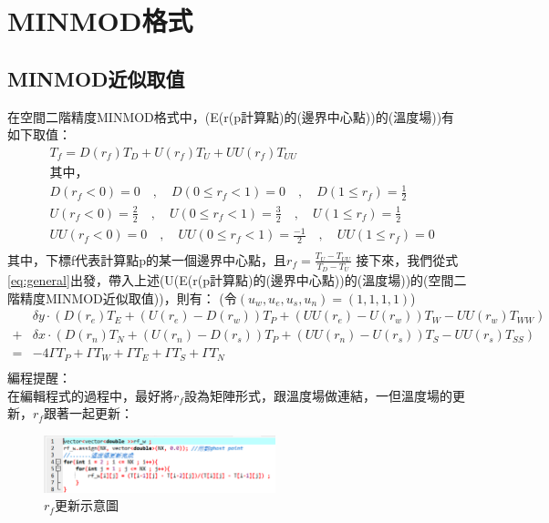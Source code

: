 \documentclass[12pt]{article}
\begin{document}
\section{MINMOD格式}
\subsection{MINMOD近似取值}
\noindent 在空間二階精度MINMOD格式中，(E(r(p計算點)的(邊界中心點))的(溫度場))有如下取值：
\begin{equation*}\begin{split}
    &T_{f} = D(r_{f})T_{D}+U(r_{f})T_{U}+UU(r_{f})T_{UU}\\[1.5ex]
    &\text{其中，}\\
    &D(r_{f}<0) = 0\quad,\quad D(0 \leq r_{f}<1) = 0 \quad,\quad D(1 \leq r_{f}) = \frac{1}{2}  \\[1.5ex]
    &U(r_{f}<0) = \frac{2}{2}\quad,\quad U(0 \leq r_{f}<1) = \frac{3}{2}\quad,\quad U(1 \leq r_{f}) = \frac{1}{2} \\[1.5ex]
    &UU(r_{f}<0) = 0\quad,\quad UU(0 \leq r_{f}<1) = \frac{-1}{2}\quad,\quad UU(1 \leq r_{f}) = 0 \\[1.5ex] 
\end{split}\end{equation*}
\noindent 其中，下標f代表計算點p的某一個邊界中心點，且$r_{f} = \frac{T_{U} - T_{UU}}{T_{D} - T_{U}}$
接下來，我們從式\ref{eq:general}出發，帶入上述(U(E(r(p計算點)的(邊界中心點))的(溫度場))的(空間二階精度MINMOD近似取值))，則有：
(令$(u_{w},u_{e},u_{s},u_{n}) = (1,1,1,1)$)
\begin{equation}\begin{split}
     &\delta y \cdot (D(r_{e})T_{E}+(U(r_{e})-D(r_{w}))T_{P}+(UU(r_{e})-U(r_{w}))T_{W} -UU(r_{w})T_{WW})\\[1.5ex]
    +&\delta x \cdot (D(r_{n})T_{N}+(U(r_{n})-D(r_{s}))T_{P}+(UU(r_{n})-U(r_{s}))T_{S} -UU(r_{s})T_{SS})\\[1.5ex]
    =& -4\Gamma T_{P} + \Gamma T_{W} + \Gamma T_{E} + \Gamma  T_{S} + \Gamma T_{N} \\[1.5ex]
\end{split}\end{equation}
\noindent 編程提醒：\\[1.5ex]
\noindent 在編輯程式的過程中，最好將$r_{f}$設為矩陣形式，跟溫度場做連結，一但溫度場的更新，$r_{f}$跟著一起更新：
\begin{figure}[H]
    \centering
    \includegraphics[width=0.6\textwidth]{29.png}
    \caption{$r_{f}$\footnotesize 更新示意圖}
    \label{fig:r_f更新}
\end{figure}
\end{document}
